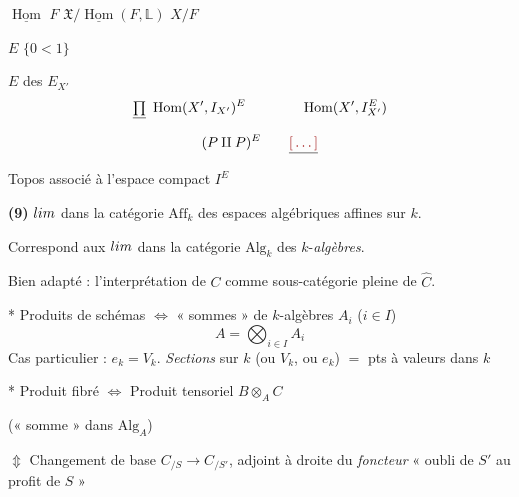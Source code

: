 \documentclass[11pt,a4paper]{article}
\begin{document}
$\underline{\operatorname{Hom}}$ \qquad \struck{\ill{}} $F$ \qquad $\mathfrak{X} / \underline{\operatorname{Hom}}(F, \mathbb{L})$ \qquad $X/F$

$E$  \ill{} $\{0 < 1\}$ \ill{} \ill{}

$E$ \ill{} \ill{}  des $E_{X'}$ \ill{}
\[
\struck{\textstyle\prod} \ \operatorname{Hom}(X', I_{X'})^E \qquad\qquad \operatorname{Hom}(X', I_{X'}^E)
\]
\[
(P \amalg P)^E \qquad \struck{\ill{}}
\]
Topos associé à l'espace compact $I^E$


\textbf{(9)} $\varprojlim$ dans la catégorie $\mathrm{Aff}_k$ des espaces algébriques affines sur $k$.

Correspond aux $\varinjlim$ dans la catégorie $\mathrm{Alg}_k$ des $k$-\emph{algèbres}.

\quad Bien adapté : l'interprétation de $C$ comme sous-catégorie pleine de $\widehat{C}$.

* Produits de schémas $\Longleftrightarrow$ « sommes » de $k$-algèbres $A_i$ ($i \in I$)
\[
A = \bigotimes_{i \in I} A_i
\]
Cas particulier :  $e_k = V_k$. \qquad \emph{Sections} sur $k$ (ou $V_k$, ou $e_k$) $=$ pts à valeurs dans $k$ \struck{\ill{}}

* Produit fibré $\Longleftrightarrow$ Produit tensoriel $B \otimes_A C$

 \qquad (« somme » dans $\mathrm{Alg}_A$)

$\Updownarrow$ Changement de base $C_{/S} \to C_{/S'}$, adjoint à droite du \emph{foncteur} « oubli de $S'$ au profit de $S$ »



\end{document}
